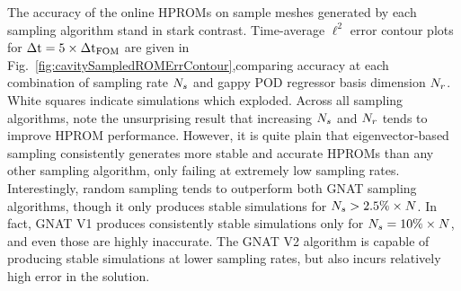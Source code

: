 The accuracy of the online HPROMs on sample meshes generated by each sampling algorithm stand in stark contrast. Time-average $\ell^2$ error contour plots for $\Delta \text{t} = 5 \times \Delta \text{t}_{\text{FOM}}$ are given in Fig.~\ref{fig:cavitySampledROMErrContour},comparing accuracy at each combination of sampling rate $N_s$ and gappy POD regressor basis dimension $N_r$. White squares indicate simulations which exploded. Across all sampling algorithms, note the unsurprising result that increasing $N_s$ and $N_r$ tends to improve HPROM performance. However, it is quite plain that eigenvector-based sampling consistently generates more stable and accurate HPROMs than any other sampling algorithm, only failing at extremely low sampling rates. Interestingly, random sampling tends to outperform both GNAT sampling algorithms, though it only produces stable simulations for $N_s > 2.5\% \times N$. In fact, GNAT V1 produces consistently stable simulations only for $N_s = 10\% \times N$, and even those are highly inaccurate. The GNAT V2 algorithm is capable of producing stable simulations at lower sampling rates, but also incurs relatively high error in the solution.

